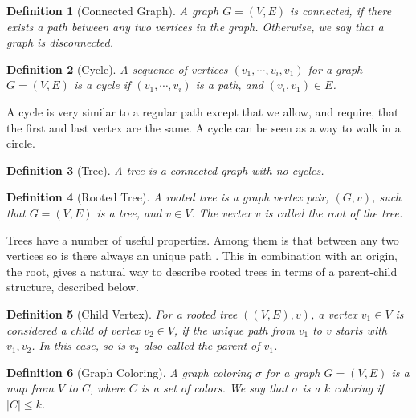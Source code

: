 \documentclass[a4paper]{article}
\newtheorem{definition}{Definition}[section]
\begin{document}

\begin{definition}[Connected Graph]
    A graph $G = (V,E)$ is connected, if there exists a path between any two
    vertices in the graph. Otherwise, we say that a graph is disconnected.
\end{definition}


\begin{definition}[Cycle]
    A sequence of vertices $(v_1,\cdots,v_i,v_1)$ for a graph $G = (V,E)$ is a cycle
    if $(v_1,\cdots,v_i)$ is a path, and $(v_i,v_1) \in E$.
\end{definition}

A cycle is very similar to a regular path except that we allow, and require,
that the first and last vertex are the same. A cycle can be seen as a way to walk
in a circle. 

\begin{definition}[Tree]{\cite{Trees}}
    A tree is a connected graph with no cycles.
\end{definition}
\begin{definition}[Rooted Tree]{\cite{Trees}}
    A rooted tree is a graph vertex pair, $(G,v)$, such that $G = (V,E)$ is a tree,
    and $v \in V$. The vertex $v$ is called the root of the tree.
\end{definition}

Trees have a number of useful properties. Among them is that between any two
vertices so is there always an unique path \cite{Trees}. This in combination
with an origin, the root, gives a natural way to describe rooted trees in terms
of a parent-child structure, described below.

\begin{definition}[Child Vertex]{\cite{Trees}}
    For a rooted tree $((V,E),v)$, a vertex $v_1 \in V$ is considered a child
    of vertex $v_2 \in V$, if the unique path from $v_1$ to $v$ starts with
    $v_1,v_2$. In this case, so is $v_2$ also called the parent of $v_1$.
\end{definition}


\begin{definition}[Graph Coloring]
    A graph coloring $\sigma$ for a graph $G = (V,E)$ is a map from $V$ to $C$,
    where $C$ is a set of colors. We say that $\sigma$
    is a $k$ coloring if $|C| \leq k$.
\end{definition}
\end{document}
